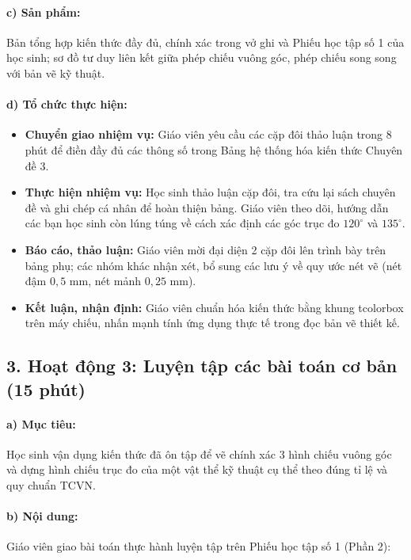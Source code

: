 \documentclass[12pt, a4paper]{article}
\begin{document}
\paragraph{c) Sản phẩm:} Bản tổng hợp kiến thức đầy đủ, chính xác trong vở ghi và Phiếu học tập số 1 của học sinh; sơ đồ tư duy liên kết giữa phép chiếu vuông góc, phép chiếu song song với bản vẽ kỹ thuật.

\paragraph{d) Tổ chức thực hiện:}
\begin{itemize}[leftmargin=0.8cm]
    \item \textbf{Chuyển giao nhiệm vụ:} Giáo viên yêu cầu các cặp đôi thảo luận trong 8 phút để điền đầy đủ các thông số trong Bảng hệ thống hóa kiến thức Chuyên đề 3.
    \item \textbf{Thực hiện nhiệm vụ:} Học sinh thảo luận cặp đôi, tra cứu lại sách chuyên đề và ghi chép cá nhân để hoàn thiện bảng. Giáo viên theo dõi, hướng dẫn các bạn học sinh còn lúng túng về cách xác định các góc trục đo $120^\circ$ và $135^\circ$.
    \item \textbf{Báo cáo, thảo luận:} Giáo viên mời đại diện 2 cặp đôi lên trình bày trên bảng phụ; các nhóm khác nhận xét, bổ sung các lưu ý về quy ước nét vẽ (nét đậm $0{,}5\text{ mm}$, nét mảnh $0{,}25\text{ mm}$).
    \item \textbf{Kết luận, nhận định:} Giáo viên chuẩn hóa kiến thức bằng khung tcolorbox trên máy chiếu, nhấn mạnh tính ứng dụng thực tế trong đọc bản vẽ thiết kế.
\end{itemize}

\subsection*{3. Hoạt động 3: Luyện tập các bài toán cơ bản (15 phút)}

\paragraph{a) Mục tiêu:} Học sinh vận dụng kiến thức đã ôn tập để vẽ chính xác 3 hình chiếu vuông góc và dựng hình chiếu trục đo của một vật thể kỹ thuật cụ thể theo đúng tỉ lệ và quy chuẩn TCVN.

\paragraph{b) Nội dung:} Giáo viên giao bài toán thực hành luyện tập trên Phiếu học tập số 1 (Phần 2):
\end{document}
